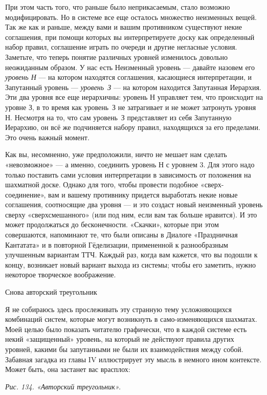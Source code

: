\documentclass[../main.tex]{subfiles}
\begin{document}
При этом часть того, что раньше было неприкасаемым, стало возможно модифицировать. Но в системе все еще осталось множество неизменных вещей. Так же как и раньше, между вами и вашим противником существуют некие соглашения, при помощи которых вы интерпретируете доску как определенный набор правил, соглашение играть по очереди и другие негласные условия. Заметьте, что теперь понятие различных уровней изменилось довольно неожиданным образом. У нас есть Неизменный уровень --- давайте назовем его \emph{уровень Н} --- на котором находятся соглашения, касающиеся интерпретации, и Запутанный уровень --- \emph{уровень~З} --- на котором находится Запутанная Иерархия. Эти два уровня все еще иерархичны: уровень Н управляет тем, что происходит на уровне З, в то время как уровень~З не затрагивает и не может затронуть уровня Н. Несмотря на то, что сам уровень~З представляет из себя Запутанную Иерархию, он всё же подчиняется набору правил, находящихся за его пределами. Это очень важный момент.

Как вы, несомненно, уже предположили, ничто не мешает нам сделать «невозможное» --- а именно, соединить уровень Н с уровнем 3. Для этого надо только поставить сами условия интерпретации в зависимость от положения на шахматной доске. Однако для того, чтобы провести подобное «сверх-соединение», вам и вашему противнику придется выработать некие новые соглашения, соотносящие два уровня --- и это создаст новый неизменный уровень сверху «сверхсмешанного» (или под ним, если вам так больше нравится). И это может продолжаться до бесконечности. «Скачки», которые при этом совершаются, напоминают те, что были описаны в Диалоге «Праздничная Кантатата» и в повторной Гёделизации, примененной к разнообразным улучшенным вариантам ТТЧ\@. Каждый раз, когда вам кажется, что вы подошли к концу, возникает новый вариант выхода из системы; чтобы его заметить, нужно некоторое творческое воображение.

Снова авторский треугольник

Я не собираюсь здесь прослеживать эту странную тему усложняющихся комбинаций систем, которые могут возникнуть в само-изменяющихся шахматах. Моей целью было показать читателю графически, что в каждой системе есть некий «защищенный» уровень, на который не действуют правила других уровней, какими бы запутанными не были их взаимодействия между собой. Забавная загадка из главы IV иллюстрирует эту мысль в немного ином контексте. Может быть, она застанет вас врасплох:

\emph{Рис. 134. «Авторский треугольник».}
\end{document}
